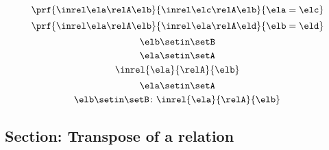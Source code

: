 {\begin{forslides}
        \begin{equation}
            \label{eq:slides_session2_rel_126}
            \prf{
                \inrel \ela \relA \elb
            }{
                \inrel \elc \relA \elb
            }{
                \ela=\elc
            }
        \end{equation}
        \begin{equation}
            \label{eq:slides_session2_rel_127}
            \prf{
                \inrel \ela \relA \elb
            }{
                \inrel \ela \relA \eld
            }{
                \elb = \eld
            }
        \end{equation}
        \begin{equation}
            \label{eq:slides_session2_rel_128}
            \elb\setin \setB
        \end{equation}
        \begin{equation}
            \label{eq:slides_session2_rel_129}
            \ela\setin \setA
        \end{equation}
        \begin{equation}
            \label{eq:slides_session2_rel_130}
            \inrel{\ela}{\relA}{\elb}
        \end{equation}
        \begin{equation}
            \label{eq:slides_session2_rel_131}
            \ela\setin \setA
        \end{equation}
        \begin{equation}
            \label{eq:slides_session2_rel_132}
            \elb \setin \setB\colon \inrel{\ela}{\relA}{\elb}
        \end{equation}

        \subsection{Section: Transpose of a relation}


\end{forslides}}
